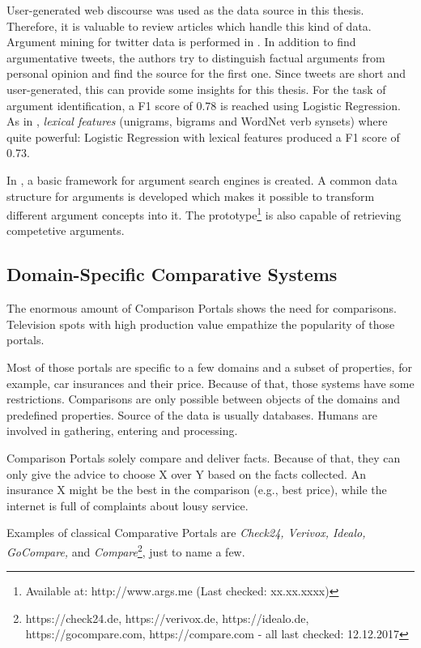 User-generated web discourse was used as the data source in this thesis. Therefore, it is valuable to review articles which handle this kind of data.
Argument mining for twitter data is performed in \cite{Dusmanu2017Argument-Mining}. In addition to find argumentative tweets, the authors try to distinguish factual arguments from personal opinion and find the source for the first one. Since tweets are short and user-generated, this can provide some insights for this thesis. For the task of argument identification, a F1 score of 0.78 is reached using Logistic Regression. As in \cite{Daxenberger2017What-is-the-Ess}, \emph{lexical features} (unigrams, bigrams and WordNet verb synsets) where quite powerful: Logistic Regression with lexical features produced a F1 score of 0.73.\newline

In \cite{Wachsmuth2017Building-an-arg}, a basic framework for argument search engines is created. A common data structure for arguments is developed which makes it possible to transform different argument concepts into it. The prototype\footnote{Available at: http://www.args.me (Last checked: xx.xx.xxxx)} is also capable of retrieving competetive arguments.



\subsection{Domain-Specific Comparative Systems}
The enormous amount of Comparison Portals shows the need for comparisons. Television spots with high production value empathize the popularity of those portals.

Most of those portals are specific to a few domains and a subset of properties, for example, car insurances and their price. Because of that, those systems have some restrictions. Comparisons are only possible between objects of the domains and predefined properties. Source of the data is usually databases. Humans are involved in gathering, entering and processing. 

Comparison Portals solely compare and deliver facts. Because of that, they can only give the advice to choose X over Y based on the facts collected.  An insurance X might be the best in the comparison (e.g., best price), while the internet is full of complaints about lousy service.\newline

Examples of classical Comparative Portals are \emph{Check24, Verivox, Idealo, GoCompare,} and \emph{Compare}\footnote{https://check24.de, https://verivox.de, https://idealo.de, https://gocompare.com, https://compare.com - all last checked: 12.12.2017}, just to name a few.

